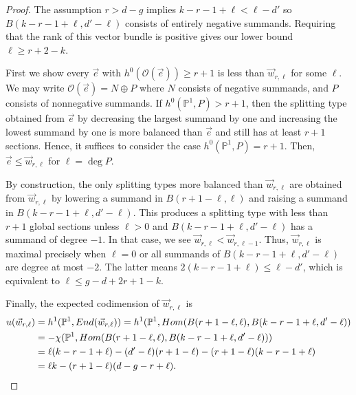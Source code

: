 \documentclass[12pt]{amsart}
\newcommand{\pp}{\mathbb{P}}
\renewcommand{\O}{\mathscr{O}}
\theoremstyle{definition}
\theoremstyle{remark}
\theoremstyle{remark}
\numberwithin{equation}{section}
\begin{document}
\begin{proof}
The assumption $r > d - g$ implies $k - r - 1 + \ell < \ell - d'$ so $B(k-r-1+\ell, d'-\ell)$ consists of entirely negative summands.
Requiring that the rank of this vector bundle is positive gives our lower bound $\ell \geq r + 2 - k$.



First we show every $\vec{e}$ with $h^0(\O(\vec{e})) \geq r+1$ is less than $\vec{w}_{r,\ell}$ for some $\ell$.
We may write $\O(\vec{e}) = N \oplus P$ where $N$ consists of negative summands, and $P$ consists of nonnegative summands. If $h^0(\pp^1, P) > r + 1$, then the splitting type obtained from $\vec{e}$ by decreasing the largest summand by one and increasing the lowest summand by one is more balanced than $\vec{e}$ and still has at least $r+1$ sections. Hence, it suffices to consider the case $h^0(\pp^1, P) = r +1$. Then, $\vec{e} \leq \vec{w}_{r,\ell}$ for $\ell = \deg P$.

By construction, the only splitting types more balanced than $\vec{w}_{r,\ell}$ are obtained from $\vec{w}_{r,\ell}$ by lowering a summand in $B(r+1 - \ell, \ell)$ and raising a summand in $B(k-r-1+\ell, d'-\ell) $. This produces a splitting type with less than $r+1$ global sections unless $\ell > 0$ and $B(k-r-1+\ell, d'-\ell)$ has a summand of degree $-1$. In that case, we see $\vec{w}_{r,\ell} < \vec{w}_{r, \ell-1}$. Thus, $\vec{w}_{r,\ell}$ is maximal precisely when $\ell = 0$ or all summands of $B(k-r-1+\ell, d'-\ell)$ are degree at most $-2$. The latter means
$2(k - r - 1 + \ell) \leq \ell - d'$, which is equivalent to $\ell \leq g - d + 2r + 1 - k$.

Finally, the expected codimension of $\vec{w}_{r,\ell}$ is 
\begin{align*}
u(\vec{w}_{r,\ell}) &= h^1(\pp^1, End(\vec{w}_{r,\ell})) = h^1(\pp^1, Hom(B(r+1 - \ell, \ell), B(k - r - 1 + \ell, d' - \ell)) \\
&= - \chi(\pp^1, Hom(B(r+1 - \ell, \ell), B(k - r - 1 + \ell, d' - \ell)))\\
&= \ell(k - r - 1 + \ell) - (d' - \ell)(r+1 - \ell) - (r + 1 - \ell)(k - r - 1 + \ell) \\
&= \ell k -(r + 1 - \ell)( d -g - r + \ell). \qedhere
\end{align*}
\end{proof}
\end{document}
